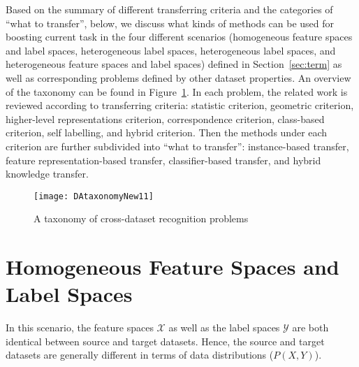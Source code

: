 \documentclass[prodmode]{acmsmall}  %
\begin{document}
Based on the summary of different transferring criteria and the categories of ``what to transfer'', below, we discuss what kinds of methods can be used for boosting current task
in the four different scenarios (homogeneous feature spaces and label spaces, heterogeneous label spaces, heterogeneous label spaces, and heterogeneous feature spaces and label spaces) defined in Section~\ref{sec:term} as well as corresponding problems defined by other dataset properties. An overview of the taxonomy can be found in Figure~\ref{tab:tax}. In each problem, the related work is reviewed according to transferring criteria: statistic criterion, geometric criterion, higher-level representations criterion, correspondence criterion, class-based criterion, self labelling, and hybrid criterion. Then the methods under each criterion are further subdivided into ``what to transfer'': instance-based transfer, feature representation-based transfer, classifier-based transfer, and hybrid knowledge transfer.
\begin{figure}
\texttt{[image: DAtaxonomyNew11]}
\vspace{-2.5em}
\caption{A taxonomy of cross-dataset recognition problems}
\label{tab:tax}
\end{figure}
\section{Homogeneous Feature Spaces and Label Spaces}
\label{sec:HOMO}
In this scenario, the feature spaces $\mathcal{X}$ as well as the label spaces $\mathcal{Y}$ are both identical between source and target datasets.
Hence, the source and target datasets are generally different in terms of data distributions ($P(X,Y)$).
\end{document}
